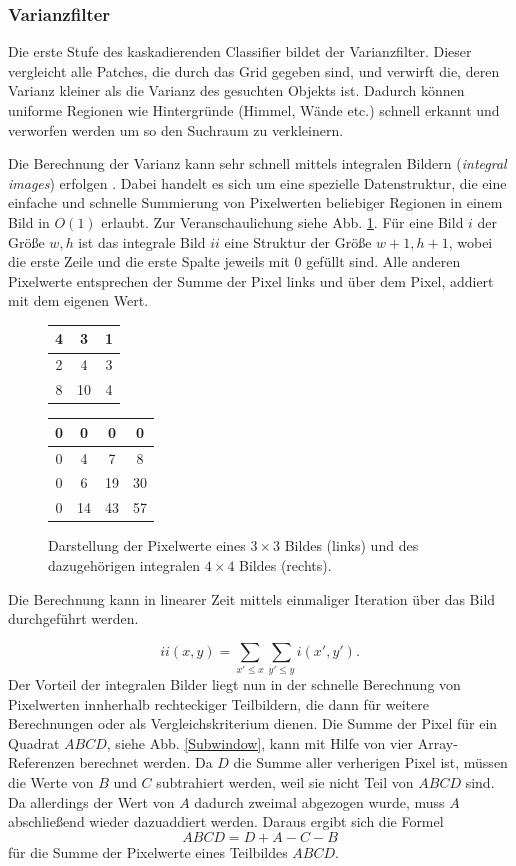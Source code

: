 \subsubsection{Varianzfilter}
Die erste Stufe des kaskadierenden Classifier bildet der Varianzfilter. Dieser vergleicht alle Patches, die durch das Grid gegeben sind, und verwirft die, deren Varianz kleiner als die Varianz des gesuchten Objekts ist. Dadurch können uniforme Regionen wie Hintergründe (Himmel, Wände etc.) schnell erkannt und verworfen werden um so den Suchraum zu verkleinern.

Die Berechnung der Varianz kann sehr schnell mittels integralen Bildern (\textit{integral images}) erfolgen \cite{key-6}. Dabei handelt es sich um eine spezielle Datenstruktur, die eine einfache und schnelle Summierung von Pixelwerten beliebiger Regionen in einem Bild in $O(1)$ erlaubt. Zur Veranschaulichung siehe Abb. \ref{integralImg}. Für eine Bild $i$ der Größe $w,h$ ist das integrale Bild $ii$ eine Struktur der Größe $w+1,h+1$, wobei die erste Zeile und die erste Spalte jeweils mit $0$ gefüllt sind. Alle anderen Pixelwerte entsprechen der Summe der Pixel links und über dem Pixel, addiert mit dem eigenen Wert.

\begin{figure}[h]
\centering{}%
\begin{tabular}{|c|c|c|}
\hline
4 & 3 & 1
\tabularnewline
\hline
\hline
2 & 4 & 3
\tabularnewline
\hline
8 & 10 & 4
\tabularnewline
\hline
\end{tabular} %
\begin{tabular}{|c|c|c|c|}
\hline
0 & 0 & 0 & 0
\tabularnewline
\hline
\hline
0 & 4 & 7 & 8\tabularnewline
\hline
0 & 6 & 19 & 30
\tabularnewline
\hline
0 & 14 & 43 & 57
\tabularnewline
\hline
\end{tabular}\caption{Darstellung der Pixelwerte eines $3\times3$ Bildes (links) und des
dazugehörigen integralen $4\times4$ Bildes (rechts).}
\label{integralImg}
\end{figure}

Die Berechnung kann in linearer Zeit mittels einmaliger Iteration über das Bild durchgeführt werden.

$$ ii(x,y)=\underset{x'\leq x}{\sum}\underset{y'\leq y}{\sum}i(x',y'). $$
Der Vorteil der integralen Bilder liegt nun in der schnelle Berechnung von Pixelwerten innherhalb rechteckiger Teilbildern, die dann für weitere Berechnungen oder als Vergleichskriterium dienen. Die Summe der Pixel für ein Quadrat $ABCD$, siehe Abb. \ref{Subwindow}, kann mit Hilfe von vier Array-Referenzen berechnet werden. Da $D$ die Summe aller verherigen Pixel ist, müssen die Werte von $B$ und $C$ subtrahiert werden, weil sie nicht Teil von $ABCD$ sind. Da allerdings der Wert von $A$ dadurch zweimal abgezogen wurde, muss $A$ abschließend wieder dazuaddiert werden. Daraus ergibt sich die Formel $$ABCD=D+A-C-B$$ für die Summe der Pixelwerte eines Teilbildes $ABCD$.

